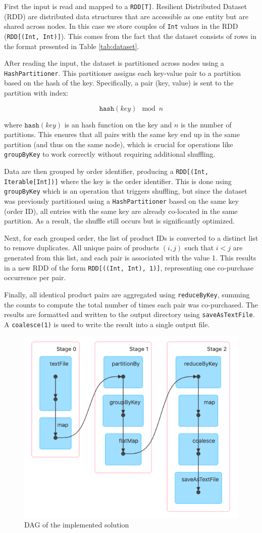 \documentclass[conference]{IEEEtran}
\newcommand{\code}[1]{\texttt{#1}}
\begin{document}
First the input is read and mapped to a \code{RDD[T]}. Resilient Distributed Dataset (RDD) are distributed data structures that are accessible as one entity but are shared across nodes. In this case we store couples of \code{Int} values in the RDD (\code{RDD[(Int, Int)]}). This comes from the fact that the dataset consists of rows in the format presented in Table \ref{tab:dataset}.

After reading the input, the dataset is partitioned across nodes using a \code{HashPartitioner}. This partitioner assigns each key-value pair to a partition based on the hash of the key. Specifically, a pair (key, value) is sent to the partition with index:

\begin{equation}
    \texttt{hash}(key) \mod n
\end{equation}

where $\texttt{hash}(key)$ is an hash function on the key and $n$ is the number of partitions. This ensures that all pairs with the same key end up in the same partition (and thus on the same node), which is crucial for operations like \code{groupByKey} to work correctly without requiring additional shuffling.

Data are then grouped by order identifier, producing a \code{RDD[(Int, Iterable[Int])]} where the key is the order identifier. This is done using \code{groupByKey} which is an operation that triggers shuffling, but since the dataset was previously partitioned using a \code{HashPartitioner} based on the same key (order ID), all entries with the same key are already co-located in the same partition. As a result, the shuffle still occurs but is significantly optimized.

Next, for each grouped order, the list of product IDs is converted to a distinct list to remove duplicates. All unique pairs of products $(i,j)$ such that $i<j$ are generated from this list, and each pair is associated with the value 1. This results in a new RDD of the form \code{RDD[((Int, Int), 1)]}, representing one co-purchase occurrence per pair.

Finally, all identical product pairs are aggregated using \code{reduceByKey}, summing the counts to compute the total number of times each pair was co-purchased. The results are formatted and written to the output directory using \code{saveAsTextFile}. A \code{coalesce(1)} is used to write the result into a single output file.

\begin{figure}[htbp]
\centerline{\includegraphics[width=0.5\linewidth]{dag.png}}
\caption{DAG of the implemented solution}
\label{fig:dag}
\end{figure}
\end{document}
